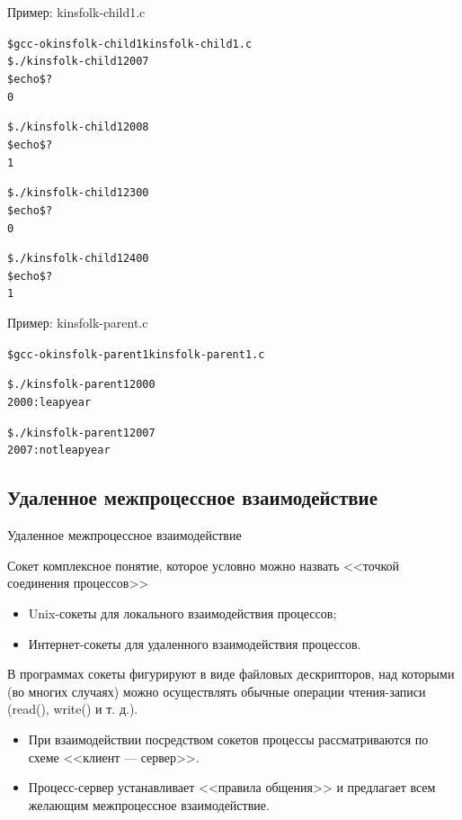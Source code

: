 \documentclass[xcolor=table]{beamer}
\begin{document}
\begin{frame}[fragile]{Пример: kinsfolk-child1.c}
\begin{alltt}
\$ gcc -o kinsfolk-child1 kinsfolk-child1.c
\$ ./kinsfolk-child1 2007
\$ echo \$?
0

\$ ./kinsfolk-child1 2008
\$ echo \$?
1

\$ ./kinsfolk-child1 2300
\$ echo \$?
0

\$ ./kinsfolk-child1 2400
\$ echo \$?
1
\end{alltt}
\end{frame}

\begin{frame}[fragile]{Пример: kinsfolk-parent.c}
\begin{alltt}
\$ gcc -o kinsfolk-parent1 kinsfolk-parent1.c

\$ ./kinsfolk-parent1 2000
2000: leap year

\$ ./kinsfolk-parent1 2007
2007: not leap year
\end{alltt}
\end{frame}

\subsection{Удаленное межпроцессное взаимодействие}

\begin{frame}{Удаленное межпроцессное взаимодействие}
	\begin{block}{Сокет}
		комплексное понятие, которое условно можно назвать <<точкой соединения процессов>>
	\end{block}
	\begin{itemize}
		\item Unix-сокеты для локального взаимодействия процессов;
		\item Интернет-сокеты для удаленного взаимодействия процессов.
\end{itemize}
	В программах сокеты фигурируют в виде файловых дескрипторов, над которыми (во многих случаях) можно осуществлять обычные операции чтения-записи (read(), write() и т. д.). 
	\begin{itemize}
		\item При взаимодействии посредством сокетов процессы рассматриваются по схеме <<клиент — сервер>>.
		\item Процесс-сервер устанавливает <<правила общения>> и предлагает всем желающим межпроцессное взаимодействие. 
	\end{itemize}
\end{frame}
\end{document}
